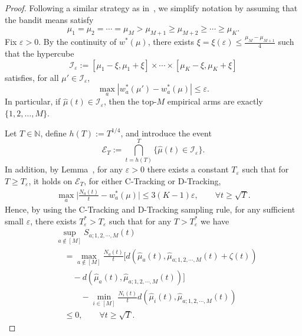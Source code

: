 \documentclass[final]{IEEEtran}
\newcommand{\nn}{\nonumber}
\newcommand{\calE}{\mathcal{E}}
\newcommand{\eps}{\varepsilon}
\begin{document}
\begin{proof}
Following a similar strategy as in~\cite[Theorem 14]{garivier2016optimal}, we simplify notation by assuming that the bandit means satisfy
\[
\mu_1 = \mu_2 = \cdots = \mu_M > \mu_{M+1} \geq \mu_{M+2} \geq \cdots \geq \mu_K.
\]
Fix $\varepsilon > 0$. By the continuity of $w^*(\mu)$, there exists $\xi = \xi(\varepsilon) \leq \frac{\mu_M - \mu_{M+1}}{4}$ such that the hypercube
\[
\mathcal{I}_{\varepsilon} := [\mu_1 - \xi, \mu_1 + \xi] \times \cdots \times [\mu_K - \xi, \mu_K + \xi]
\]
satisfies, for all $\mu' \in \mathcal{I}_{\varepsilon}$,
\[
\max_a \left| w_a^*(\mu') - w_a^*(\mu) \right| \leq \varepsilon.
\]
In particular, if $\hat{\mu}(t) \in \mathcal{I}_\varepsilon$, then the top-$M$ empirical arms are exactly $\{1,2,\dots,M\}$.

Let $T \in \mathbb{N}$, define $h(T) := T^{1/4}$, and introduce the event
\[
\mathcal{E}_T := \bigcap_{t=h(T)}^T \{ \hat{\mu}(t) \in \mathcal{I}_\varepsilon \}.
\]
In addition, by Lemma~\cite[Lemma 20]{garivier2016optimal}, for any $\eps>0$ there exists a constant $T_{\eps}$ such that for $T\geq T_{\eps}$, it holds on $\calE_T$, for either C-Tracking or D-Tracking,
\begin{align}
\max_a \bigg|\frac{N_a(t)}{t}-w_a^*(\mu)\bigg| \leq 3 (K-1)\eps, \qquad \forall t \geq \sqrt{T}. 
\end{align}
Hence, by using the C-Tracking and D-Tracking sampling rule, for any sufficient small $\eps$, there exists $T^*_{\eps}> T_{\eps}$  such that for any $T>T_{\eps}^*$ we have
\begin{align}
&\sup_{a\notin [M]} S_{a;1,2,\cdots,M}(t)\nn\\
&\quad =\max_{a \notin [M]} \frac{N_a(t)}{t} \big[d(\hat{\mu}_a(t),\hat{\mu}_{a;1,2,\cdots,M}(t)+\zeta(t))\nn\\
&\qquad - d(\hat{\mu}_a(t),\hat{\mu}_{a;1,2,\cdots,M}(t))\big]\nn\\
&\quad \qquad  -\min_{i \in [M]} \frac{N_i(t)}{t} d(\hat{\mu}_i(t),\hat{\mu}_{a;1,2,\cdots,M}(t)) \nn \\
&\quad \leq 0, \qquad \forall t \geq \sqrt{T}. 
\end{align}


\end{proof}
\end{document}
